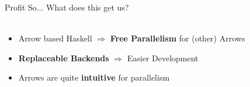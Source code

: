 \begin{frame}[fragile]{Profit}
So... What does this get us?\\~\\
\begin{itemize}
	\item Arrow based Haskell $\Rightarrow$ \textbf{Free Parallelism} for (other) Arrows
	\item \textbf{Replaceable Backends} $\Rightarrow$ Easier Development
	\item Arrows are quite \textbf{intuitive} for parallelism
\end{itemize}
\vfill	
\end{frame}